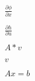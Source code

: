 \documentclass{article}
\begin{document}
$ \frac{\partial \phi}{\partial x} $
\pagebreak

$ \frac{\partial h}{\partial u} $
\pagebreak

$ A * v $
\pagebreak

$ v $
\pagebreak

$ A x = b $
\pagebreak
\end{document}
